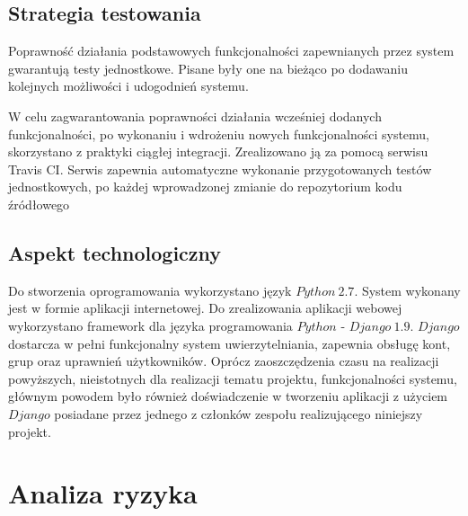 \documentclass[pdflatex,11pt]{../aghdoc_version2}
\newlength\tindent
\renewcommand{\indent}{\hspace*{\tindent}}
\begin{document}
\section{Strategia testowania}
Poprawność działania podstawowych funkcjonalności zapewnianych przez system
gwarantują testy jednostkowe. Pisane były one na bieżąco po dodawaniu kolejnych
możliwości i udogodnień systemu.

\indent W celu zagwarantowania poprawności działania wcześniej dodanych funkcjonalności, po
wykonaniu i wdrożeniu nowych funkcjonalności systemu, skorzystano z praktyki ciągłej
integracji. Zrealizowano ją za pomocą serwisu Travis CI. Serwis zapewnia automatyczne
wykonanie przygotowanych testów jednostkowych, po każdej wprowadzonej zmianie do
repozytorium kodu źródłowego
\section{Aspekt technologiczny}
\label{sec:apekt_technologiczny}
Do stworzenia oprogramowania wykorzystano język $Python \ 2.7$. System wykonany jest w
formie aplikacji internetowej. Do zrealizowania aplikacji webowej wykorzystano framework
dla języka programowania $Python$ - $Django \ 1.9$. $Django$ dostarcza w pełni funkcjonalny
system uwierzytelniania, zapewnia obsługę kont, grup oraz uprawnień użytkowników.
Oprócz zaoszczędzenia czasu na realizacji powyższych, nieistotnych dla realizacji tematu
projektu, funkcjonalności systemu, głównym powodem było również doświadczenie w
tworzeniu aplikacji z użyciem $Django$ posiadane przez jednego z członków zespołu
realizującego niniejszy projekt.

\chapter{Analiza ryzyka}
\end{document}
